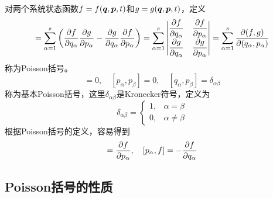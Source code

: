 对两个系统状态函数$f = f(\boldsymbol{q},\boldsymbol{p},t)$和$g = g(\boldsymbol{q},\boldsymbol{p},t)$，定义
\begin{equation}
	[f,g] = \sum_{\alpha=1}^s \left(\frac{\pl f}{\pl q_\alpha} \frac{\pl g}{\pl p_\alpha} - \frac{\pl g}{\pl q_\alpha} \frac{\pl f}{\pl p_\alpha}\right) = \sum_{\alpha=1}^s \begin{vmatrix} \dfrac{\pl f}{\pl q_\alpha} & \dfrac{\pl f}{\pl p_\alpha} \\[1.5ex] \dfrac{\pl g}{\pl q_\alpha} & \dfrac{\pl g}{\pl p_\alpha} \end{vmatrix} = \sum_{\alpha=1}^s \frac{\pl (f,g)}{\pl (q_\alpha,p_\alpha)}
\end{equation}
称为{\heiti Poisson括号}。
\begin{equation}
	[q_\alpha,q_\beta] = 0,\quad [p_\alpha,p_\beta] = 0,\quad [q_\alpha,p_\beta] = \delta_{\alpha\beta}
	\label{基本Poisson括号}
\end{equation}
称为{\heiti 基本Poisson括号}，这里$\delta_{\alpha\beta}$是Kronecker符号，定义为
\begin{equation*}
	\delta_{\alpha\beta} = \begin{cases} 1, & \alpha=\beta \\ 0, & \alpha\neq\beta \end{cases}
\end{equation*}
根据Poisson括号的定义，容易得到
\begin{equation}
	[q_\alpha, f] =\frac{\pl f}{\pl p_\alpha},\quad [p_\alpha,f] = -\frac{\pl f}{\pl q_\alpha}
\end{equation}

\subsection{Poisson括号的性质}

